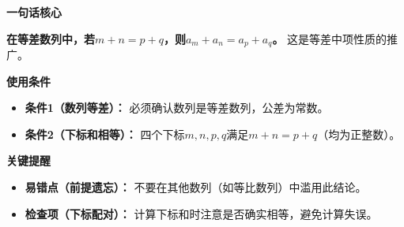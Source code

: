 \begin{summarybox}
\textbf{\textcolor{CSummary}{一句话核心}}

\textbf{在等差数列中，若$m+n=p+q$，则$a_m+a_n=a_p+a_q$。} 这是等差中项性质的推广。

\medskip
\textbf{\textcolor{CSummary}{使用条件}}
\begin{itemize}[leftmargin=*, itemsep=0.5em, topsep=0.4em]
    \item \textbf{条件1（数列等差）：} 必须确认数列是等差数列，公差为常数。
    \item \textbf{条件2（下标和相等）：} 四个下标$m,n,p,q$满足$m+n=p+q$（均为正整数）。
\end{itemize}

\medskip
\textbf{\textcolor{CSummary}{关键提醒}}
\begin{itemize}[leftmargin=*, itemsep=0.5em, topsep=0.4em]
    \item \textbf{易错点（前提遗忘）：} 不要在其他数列（如等比数列）中滥用此结论。
    \item \textbf{检查项（下标配对）：} 计算下标和时注意是否确实相等，避免计算失误。
\end{itemize}
\end{summarybox}
